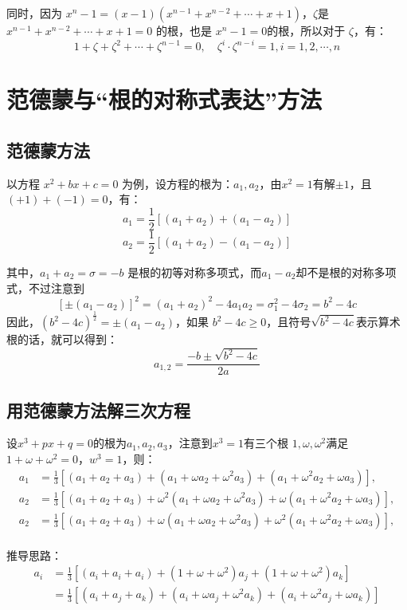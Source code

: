 \documentclass[12pt]{article}
\begin{document}
同时，因为 $x^n - 1= (x-1)(x^{n-1} + x^{n-2} + \cdots + x + 1)$，$\zeta$是$x^{n-1} + x^{n-2} + \cdots + x + 1 = 0$ 的根，也是 $x^n-1=0$的根，所以对于 $\zeta$，有：
$$
1 + \zeta + \zeta^2 + \cdots + \zeta^{n-1} = 0, \quad \zeta^i\cdot\zeta^{n-i} = 1, i = 1, 2, \cdots, n
$$

\section{范德蒙与“根的对称式表达”方法}
\subsection{范德蒙方法}
以方程 $x^2 + bx + c = 0$ 为例，设方程的根为：$a_1, a_2$，由$x^2=1$有解$\pm 1$，且$(+1) + (-1) = 0$，有：
$$
a_1 = \frac{1}{2}[(a_1 + a_2) + (a_1 - a_2)]
$$
$$
a_2 = \frac{1}{2}[(a_1 + a_2) - (a_1 - a_2)]
$$

其中，$a_1 + a_2 = \sigma = -b$ 是根的初等对称多项式，而$a_1 - a_2$却不是根的对称多项式，不过注意到
$$
[\pm(a_1 - a_2)]^2 = (a_1 + a_2)^2 - 4a_1a_2 = \sigma_1^2 - 4\sigma_2 = b^2 - 4c
$$
因此，$(b^2-4c)^{\frac{1}{2}} = \pm(a_1-a_2)$，如果 $b^2-4c \ge 0$，且符号$\sqrt{b^2-4c}$表示算术根的话，就可以得到：
$$
a_{1,2} = \frac{-b \pm \sqrt{b^2-4c}}{2a}
$$

\subsection{用范德蒙方法解三次方程}
设$x^3 + px + q = 0$的根为$a_1, a_2, a_3$，注意到$x^3=1$有三个根 $1, \omega, \omega^2$满足 $1+\omega+\omega^2=0$，$w^3 = 1$，则：
\begin{align*}
a_1 &= \frac{1}{3}[(a_1 + a_2 + a_3) + (a_1 + \omega a_2 + \omega^2a_3) + (a_1 + \omega^2 a_2 + \omega a_3)],\\
a_2 &= \frac{1}{3}[(a_1 + a_2 + a_3) + \omega^2(a_1 + \omega a_2 + \omega^2a_3) + \omega(a_1 + \omega^2 a_2 + \omega a_3)],\\
a_2 &= \frac{1}{3}[(a_1 + a_2 + a_3) + \omega(a_1 + \omega a_2 + \omega^2a_3) + \omega^2(a_1 + \omega^2 a_2 + \omega a_3)],\\
\end{align*}

\begin{framed}  
\small{
推导思路：
\begin{align*}
a_i &= \frac{1}{3}[(a_i + a_i + a_i) + (1+\omega+\omega^2)a_j + (1+\omega+\omega^2)a_k]\\
    &= \frac{1}{3}[(a_i + a_j + a_k) + (a_i + \omega a_j + \omega^2 a_k) + (a_i + \omega^2a_j + \omega a_k)]
\end{align*}
}
\end{framed}
\end{document}
